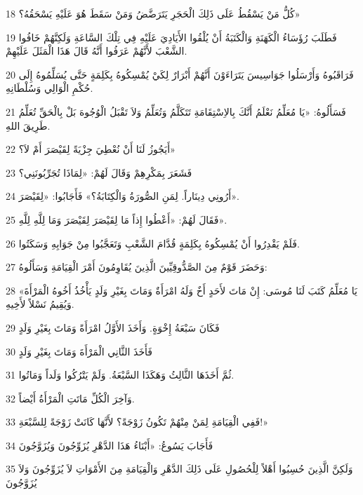 \par 18 كُلُّ مَنْ يَسْقُطُ عَلَى ذَلِكَ الْحَجَرِ يَتَرَضَّضُ وَمَنْ سَقَطَ هُوَ عَلَيْهِ يَسْحَقُهُ؟»
\par 19 فَطَلَبَ رُؤَسَاءُ الْكَهَنَةِ وَالْكَتَبَةُ أَنْ يُلْقُوا الأَيَادِيَ عَلَيْهِ فِي تِلْكَ السَّاعَةِ وَلَكِنَّهُمْ خَافُوا الشَّعْبَ لأَنَّهُمْ عَرَفُوا أَنَّهُ قَالَ هَذَا الْمَثَلَ عَلَيْهِمْ.
\par 20 فَرَاقَبُوهُ وَأَرْسَلُوا جَوَاسِيسَ يَتَرَاءَوْنَ أَنَّهُمْ أَبْرَارٌ لِكَيْ يُمْسِكُوهُ بِكَلِمَةٍ حَتَّى يُسَلِّمُوهُ إِلَى حُكْمِ الْوَالِي وَسُلْطَانِهِ.
\par 21 فَسَأَلُوهُ: «يَا مُعَلِّمُ نَعْلَمُ أَنَّكَ بِالاِسْتِقَامَةِ تَتَكَلَّمُ وَتُعَلِّمُ وَلاَ تَقْبَلُ الْوُجُوهَ بَلْ بِالْحَقِّ تُعَلِّمُ طَرِيقَ اللهِ.
\par 22 أَيَجُوزُ لَنَا أَنْ نُعْطِيَ جِزْيَةً لِقَيْصَرَ أَمْ لاَ؟»
\par 23 فَشَعَرَ بِمَكْرِهِمْ وَقَالَ لَهُمْ: «لِمَاذَا تُجَرِّبُونَنِي؟
\par 24 أَرُونِي دِينَاراً. لِمَنِ الصُّورَةُ وَالْكِتَابَةُ؟» فَأَجَابُوا: «لِقَيْصَرَ».
\par 25 فَقَالَ لَهُمْ: «أَعْطُوا إِذاً مَا لِقَيْصَرَ لِقَيْصَرَ وَمَا لِلَّهِ لِلَّهِ».
\par 26 فَلَمْ يَقْدِرُوا أَنْ يُمْسِكُوهُ بِكَلِمَةٍ قُدَّامَ الشَّعْبِ وَتَعَجَّبُوا مِنْ جَوَابِهِ وَسَكَتُوا.
\par 27 وَحَضَرَ قَوْمٌ مِنَ الصَّدُّوقِيِّينَ الَّذِينَ يُقَاوِمُونَ أَمْرَ الْقِيَامَةِ وَسَأَلُوهُ:
\par 28 «يَا مُعَلِّمُ كَتَبَ لَنَا مُوسَى: إِنْ مَاتَ لأَحَدٍ أَخٌ وَلَهُ امْرَأَةٌ وَمَاتَ بِغَيْرِ وَلَدٍ يَأْخُذُ أَخُوهُ الْمَرْأَةَ وَيُقِيمُ نَسْلاً لأَخِيهِ.
\par 29 فَكَانَ سَبْعَةُ إِخْوَةٍ. وَأَخَذَ الأَوَّلُ امْرَأَةً وَمَاتَ بِغَيْرِ وَلَدٍ
\par 30 فَأَخَذَ الثَّانِي الْمَرْأَةَ وَمَاتَ بِغَيْرِ وَلَدٍ
\par 31 ثُمَّ أَخَذَهَا الثَّالِثُ وَهَكَذَا السَّبْعَةُ. وَلَمْ يَتْرُكُوا وَلَداً وَمَاتُوا.
\par 32 وَآخِرَ الْكُلِّ مَاتَتِ الْمَرْأَةُ أَيْضاً.
\par 33 فَفِي الْقِيَامَةِ لِمَنْ مِنْهُمْ تَكُونُ زَوْجَةً؟ لأَنَّهَا كَانَتْ زَوْجَةً لِلسَّبْعَةِ!»
\par 34 فَأَجَابَ يَسُوعُ: «أَبْنَاءُ هَذَا الدَّهْرِ يُزَوِّجُونَ وَيُزَوَّجُونَ
\par 35 وَلَكِنَّ الَّذِينَ حُسِبُوا أَهْلاً لِلْحُصُولِ عَلَى ذَلِكَ الدَّهْرِ وَالْقِيَامَةِ مِنَ الأَمْوَاتِ لاَ يُزَوِّجُونَ وَلاَ يُزَوَّجُونَ
